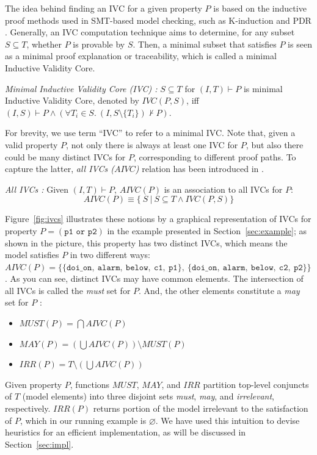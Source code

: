 The idea behind finding an IVC for a given property $P$ \cite{Ghass16} is based on the inductive proof methods used in SMT-based model checking, such as K-induction and PDR \cite{NFM2012:KaGaTiWh, amla2005analysis, Een2011:PDR}. Generally, an IVC computation technique aims to determine, for any subset $S \subseteq T$, whether $P$ is provable by $S$. Then, a minimal subset that satisfies $P$ is seen as a minimal proof explanation or traceability, which is called a minimal Inductive Validity Core.

\begin{definition}{\emph{Minimal Inductive Validity Core (IVC) \cite{Ghass16}:}}
  \label{def:minimal-ivc}
  $S \subseteq T$ for $(I, T)\vdash P$ is minimal Inductive Validity Core, 
  denoted by $IVC(P, S)$, iff
  $(I, S) \vdash P \wedge (\forall T_i \in S.~ (I, S\setminus\{ T_i \}) \nvdash P) $.
\end{definition}

For brevity, we use term ``IVC'' to refer to a minimal IVC. Note that, given a valid property $P$, not only there is always at least one IVC for $P$, but also there could be many distinct IVCs for $P$, corresponding to different proof paths. To capture the latter, \emph{all IVCs ($AIVC$)} relation has been introduced in \cite{Ghass16, Murugesan16:renext, Ghass17Cov}.
\begin{definition}{\emph{All IVCs \cite{Murugesan16:renext, Ghass17Cov}:}}
    \label{def:allivcs}
    Given $(I, T) \vdash P$, $AIVC(P)$ is an association to all IVCs for $P$: 
    $$ AIVC(P) \equiv  \{\ S~|~S \subseteq T \land  IVC(P, S)\} $$
\end{definition}

Figure~\ref{fig:ivcs} illustrates these notions by a graphical representation of IVCs for property $P = (\texttt{p1 or p2})$ in the example presented in Section~\ref{sec:example}; as shown in the picture, this property has two distinct IVCs, which means the model satisfies $P$ in two different ways: $AIVC(P) = \{ \{ \texttt{doi\_on},
~\texttt{alarm},~\texttt{below},~\texttt{c1},~\texttt{p1}\},~ \allowbreak  
\{ \texttt{doi\_on},~\texttt{alarm},
~\texttt{below},~\texttt{c2},~\texttt{p2}\}\}$. 
As you can see, distinct IVCs may have common elements. 
The intersection of all IVCs is called the \emph{must} set for $P$. 
And, the other elements constitute a \emph{may} set for $P$ \cite{Murugesan16:renext}: 
\begin{itemize}
  \item   $MUST (P) = \bigcap AIVC(P)$
  \item  $MAY(P) = (\bigcup AIVC (P)) \setminus MUST(P)$
  \item $IRR(P) = T \setminus (\bigcup AIVC(P))$
\end{itemize}
\noindent Given property $P$, functions $MUST$, $MAY$, and $IRR$ partition top-level conjuncts of $T$ (model elements) into three disjoint sets \emph{must}, \emph{may}, and \emph{irrelevant}, respectively. $IRR(P)$ returns portion of the model irrelevant to the satisfaction of $P$, which in our running example is $\varnothing$.
We have used this intuition to devise heuristics for an efficient implementation, as will be discussed in Section~\ref{sec:impl}.

